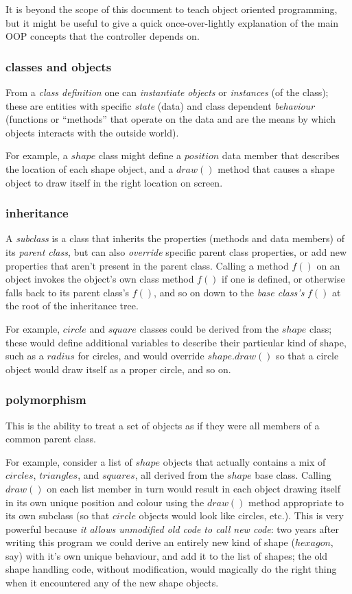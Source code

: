 \documentclass[12pt]{article}
\begin{document}
It is beyond the scope of this document to teach object oriented
programming, but it might be useful to give a quick once-over-lightly
explanation of the main OOP concepts that the controller depends on.

\subsubsection{classes and objects}


From a {\em class definition} one can {\em instantiate} {\em objects} or
{\em instances} (of the class); these are entities with specific {\em
state} (data) and class dependent {\em behaviour} (functions or
``methods'' that operate on the data and are the means by which objects
interacts with the outside world).    

For example, a $shape$ class might define a $position$ data member that
describes the location of each shape object, and a $draw()$ method that
causes a shape object to draw itself in the right location on screen.

\subsubsection{inheritance}

A {\em subclass} is a class that inherits the properties (methods and
data members) of its {\em parent class}, but can also {\em override}
specific parent class properties, or add new properties that aren't
present in the parent class. Calling a method $f()$ on an object invokes
the object's own class method $f()$ if one is defined, or otherwise
falls back to its parent class's $f()$, and so on down to the {\em
base class's} $f()$ at the root of the inheritance tree. 

For example, $circle$ and $square$ classes could be derived from the
$shape$ class; these would define additional variables to describe their
particular kind of shape, such as a $radius$ for circles, and would
override $shape.draw()$ so that a circle object would draw itself as a
proper circle, and so on.


\subsubsection{polymorphism}

This is the ability to treat a set of objects as if they were
all members of a common parent class.

For example, consider a list of $shape$ objects that actually contains a
mix of $circles$, $triangles$, and $squares$, all derived from the
$shape$ base class.  Calling $draw()$ on each list member in turn would
result in each object drawing itself in its own unique position and
colour using the $draw()$ method appropriate to its own subclass (so
that $circle$ objects would look like circles, etc.). This is very
powerful because {\em it allows unmodified old code to call new code}:
two years after writing this program we could derive an entirely new
kind of shape ($hexagon$, say) with it's own unique behaviour, and add
it to the list of shapes; the old shape handling code, without
modification, would magically do the right thing when it encountered any
of the new shape objects.
\end{document}
